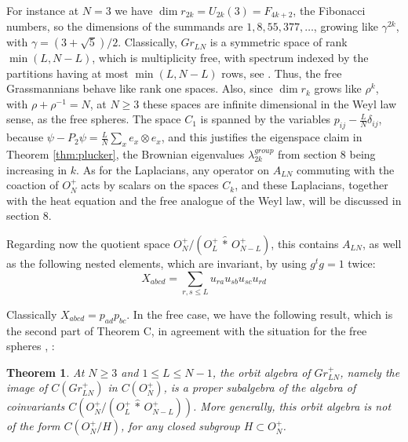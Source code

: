 \documentclass[11pt]{article}
\theoremstyle{plain}
\newtheorem{theorem}{Theorem}[section]
\begin{document}
For instance at $N=3$ we have $\dim r_{2k}=U_{2k}(3)=F_{4k+2}$, the Fibonacci numbers, so the dimensions of the summands are $1,8,55,377,\ldots$, growing like $\gamma^{2k}$, with $\gamma=(3+\sqrt{5})/2$. Classically, $Gr_{LN}$ is a symmetric space of rank $\min(L,N-L)$, which is multiplicity free, with spectrum indexed by the partitions having at most $\min(L,N-L)$ rows, see \cite{hel}. Thus, the free Grassmannians behave like rank one spaces. Also, since $\dim r_k$ grows like $\rho^k$, with $\rho+\rho^{-1}=N$, at $N\geq3$ these spaces are infinite dimensional in the Weyl law sense, as the free spheres. The space $C_1$ is spanned by the variables $p_{ij}-\frac{L}{N}\delta_{ij}$, because $\psi-P_2\psi=\frac{L}{N}\sum_xe_x\otimes e_x$, and this justifies the eigenspace claim in Theorem \ref{thm:plucker}, the Brownian eigenvalues $\lambda_{2k}^{group}$ from section 8 being increasing in $k$. As for the Laplacians, any operator on $A_{LN}$ commuting with the coaction of $O_N^+$ acts by scalars on the spaces $C_k$, and these Laplacians, together with the heat equation and the free analogue of the Weyl law, will be discussed in section 8.

\bigskip

Regarding now the quotient space $O_N^+/(O_L^+\,\widehat{*}\,O_{N-L}^+)$, this contains $A_{LN}$, as well as the following nested elements, which are invariant, by using $g^tg=1$ twice:
$$X_{abcd}=\sum_{r,s\leq L}u_{ra}u_{sb}u_{sc}u_{rd}$$

Classically $X_{abcd}=p_{ad}p_{bc}$. In the free case, we have the following result, which is the second part of Theorem C, in agreement with the situation for the free spheres \cite{ba1}, \cite{bss}:

\begin{theorem}
\label{thm:notgh}
At $N\geq3$ and $1\leq L\leq N-1$, the orbit algebra of $Gr^+_{LN}$, namely the image of $C(Gr^+_{LN})$ in $C(O_N^+)$, is a proper subalgebra of the algebra of coinvariants $C(O_N^+/(O_L^+\,\widehat{*}\,O_{N-L}^+))$. More generally, this orbit algebra is not of the form $C(O_N^+/H)$, for any closed subgroup $H\subset O_N^+$.
\end{theorem}
\end{document}
